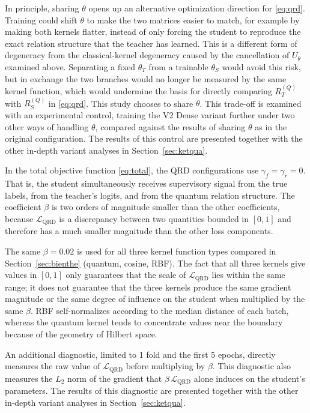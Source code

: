 In principle, sharing $\theta$ opens up an alternative optimization
direction for \eqref{eq:qrd}. Training could shift $\theta$ to make
the two matrices easier to match, for example by making both kernels
flatter, instead of only forcing the student to reproduce the exact
relation structure that the teacher has learned. This is a different
form of degeneracy from the classical-kernel degeneracy caused by the
cancellation of $U_\theta$ examined above. Separating a fixed
$\theta_T$ from a trainable $\theta_S$ would avoid this risk, but in
exchange the two branches would no longer be measured by the same
kernel function, which would undermine the basis for directly
comparing $R_T^{(Q)}$ with $R_S^{(Q)}$ in \eqref{eq:qrd}. This study
chooses to share $\theta$. This trade-off is examined with an
experimental control, training the V2 Dense variant further under
two other ways of handling $\theta$, compared against the results of
sharing $\theta$ as in the original configuration. The results of
this control are presented together with the other in-depth variant
analyses in Section~\ref{sec:ketqua}.

In the total objective function \eqref{eq:total}, the QRD
configurations use $\gamma_f = \gamma_r = 0$. That is, the student
simultaneously receives supervisory signal from the true labels, from
the teacher's logits, and from the quantum relation structure. The
coefficient $\beta$ is two orders of magnitude smaller than the other
coefficients, because $\mathcal{L}_{\mathrm{QRD}}$ is a discrepancy
between two quantities bounded in $[0,1]$ and therefore has a much
smaller magnitude than the other loss components.

The same $\beta = 0.02$ is used for all three kernel function types
compared in Section~\ref{sec:bienthe} (quantum, cosine, RBF). The
fact that all three kernels give values in $[0,1]$ only guarantees
that the scale of $\mathcal{L}_{\mathrm{QRD}}$ lies within the same
range; it does not guarantee that the three kernels produce the same
gradient magnitude or the same degree of influence on the student
when multiplied by the same $\beta$. RBF self-normalizes according
to the median distance of each batch, whereas the quantum kernel
tends to concentrate values near the boundary because of the
geometry of Hilbert space.

An additional diagnostic, limited to 1 fold and the first 5 epochs,
directly measures the raw value of $\mathcal{L}_{\mathrm{QRD}}$
before multiplying by $\beta$. This diagnostic also measures the
$L_2$ norm of the gradient that $\beta\,\mathcal{L}_{\mathrm{QRD}}$
alone induces on the student's parameters. The results of this
diagnostic are presented together with the other in-depth variant
analyses in Section~\ref{sec:ketqua}.

